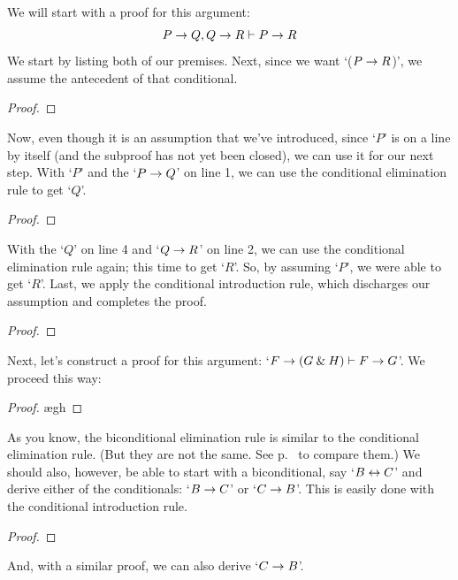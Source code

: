 \begin{earg}
\item We will start with a proof for this argument:
	$$P \rightarrow Q, Q \rightarrow R \vdash P \rightarrow R$$
We start by listing both of our premises. Next, since we want `($P \rightarrow R$)', we assume the antecedent of that conditional. 
\begin{proof}
	 \pr{}
	 \pr{}
	\open
		 \as{}
	\close
\end{proof}
Now, even though it is an assumption that we've introduced, since `$P$' is on a line by itself (and the subproof has not yet been closed), we can use it for our next step. With `$P$' and the `$P \rightarrow Q$' on line 1, we can use the conditional elimination rule to get `$Q$'. 
\begin{proof}
	 \pr{}
	 \pr{}
	\open
		\as{}
	\close
\end{proof}
With the `$Q$' on line 4 and `$Q \rightarrow R$' on line 2, we can use the conditional elimination rule again; this time to get `$R$'. So, by assuming `$P$', we were able to get `$R$'. Last, we apply the conditional introduction rule, which discharges our assumption and completes the proof.
\label{HSproof}
\begin{proof}
	 \pr{}
	 \pr{}
	\open
		\as{}
	\close
\end{proof}
\bigskip

\item Next, let's construct a proof for this argument: `$F \rightarrow (G \mathbin{\&} H) \vdash F \rightarrow G$'. We proceed this way:

\begin{proof}
	 \pr{}
	\open
		\as{}
		\ae{gh}
	\close
\end{proof}
\bigskip

\item As you know, the biconditional elimination rule is similar to the conditional elimination rule. (But they are not the same. See p.~\pageref{ce-rule} to compare them.) We should also, however, be able to start with a biconditional, say `$B \leftrightarrow C$' and derive either of the conditionals: `$B \rightarrow C$' or `$C \rightarrow B$'. This is easily done with the conditional introduction rule.
\begin{proof}
	 \pr{}
	\open
		\as{}
	\close
\end{proof}
\smallskip
\noindent And, with a similar proof, we can also derive `$C \rightarrow B$'.
\bigskip


\end{earg}
